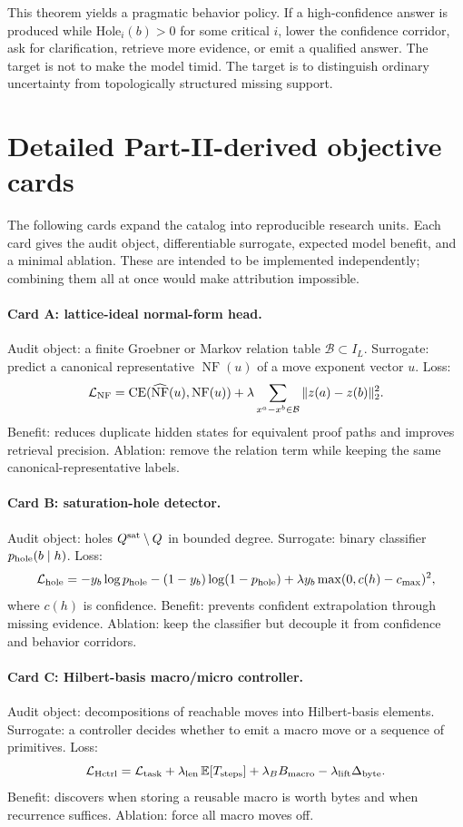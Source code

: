 \documentclass[11pt]{article}
\theoremstyle{definition}
\begin{document}
This theorem yields a pragmatic behavior policy.  If a high-confidence answer is produced while \(\mathrm{Hole}_i(b)>0\) for some critical \(i\), lower the confidence corridor, ask for clarification, retrieve more evidence, or emit a qualified answer.  The target is not to make the model timid.  The target is to distinguish ordinary uncertainty from topologically structured missing support.

\section{Detailed Part-II-derived objective cards}
The following cards expand the catalog into reproducible research units.  Each card gives the audit object, differentiable surrogate, expected model benefit, and a minimal ablation.  These are intended to be implemented independently; combining them all at once would make attribution impossible.

\paragraph{Card A: lattice-ideal normal-form head.}
Audit object: a finite Groebner or Markov relation table \(\mathcal B\subset I_L\).  Surrogate: predict a canonical representative \(\operatorname{NF}(u)\) of a move exponent vector \(u\).  Loss:
\[
  \mathcal L_{\rm NF}=\mathrm{CE}(\widehat{\operatorname{NF}}(u),\operatorname{NF}(u))
  +\lambda\sum_{x^a-x^b\in\mathcal B}\|z(a)-z(b)\|_2^2 .
\]
Benefit: reduces duplicate hidden states for equivalent proof paths and improves retrieval precision.  Ablation: remove the relation term while keeping the same canonical-representative labels.

\paragraph{Card B: saturation-hole detector.}
Audit object: holes \(Q^{\rm sat}\setminus Q\) in bounded degree.  Surrogate: binary classifier \(p_{\rm hole}(b\mid h)\).  Loss:
\[
 \mathcal L_{\rm hole}= -y_b\log p_{\rm hole}-(1-y_b)\log(1-p_{\rm hole})
 +\lambda y_b\max(0,c(h)-c_{\max})^2,
\]
where \(c(h)\) is confidence.  Benefit: prevents confident extrapolation through missing evidence.  Ablation: keep the classifier but decouple it from confidence and behavior corridors.

\paragraph{Card C: Hilbert-basis macro/micro controller.}
Audit object: decompositions of reachable moves into Hilbert-basis elements.  Surrogate: a controller decides whether to emit a macro move or a sequence of primitives.  Loss:
\[
\mathcal L_{\rm Hctrl}=\mathcal L_{\rm task}+\lambda_{\rm len}\,\mathbb E[T_{\rm steps}]
+\lambda_B B_{\rm macro}-\lambda_{\rm lift}\Delta_{\rm byte}.
\]
Benefit: discovers when storing a reusable macro is worth bytes and when recurrence suffices.  Ablation: force all macro moves off.
\end{document}
